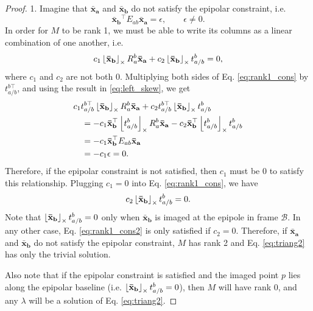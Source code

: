 	\begin{proof}
		1. Imagine that $\mathbf{\bar{x}_a}$ and $\mathbf{\bar{x}_b}$ do not satisfy the epipolar constraint, i.e.
		\begin{equation}
		\mathbf{\bar{x}_b}^\top E_{ab} \mathbf{\bar{x}_a} = \epsilon, \qquad \epsilon \neq 0.
		\end{equation}
		In order for $M$ to be rank 1, we must be able to write its columns as a linear combination of one another, i.e.
		\begin{equation}
		c_1 \ss{\mathbf{\bar{x}_b}} R_a^b \mathbf{\bar{x}_a} + c_2 \ss{\mathbf{\bar{x}_b}} t_{a/b}^b = 0,
		\label{eq:rank1_cons}
		\end{equation}
		where $c_1$ and $c_2$ are not both 0. Multiplying both sides of Eq. \ref{eq:rank1_cons} by $t_{a/b}^{b\top}$, and using the result in \ref{eq:left_skew}, we get 
		\begin{align}
		&c_1 t_{a/b}^{b\top} \ss{\mathbf{\bar{x}_b}} R_a^b \mathbf{\bar{x}_a} + c_2 t_{a/b}^{b\top} \ss{\mathbf{\bar{x}_b}} t_{a/b}^b \\
		&\quad = -c_1 \mathbf{\bar{x}_b}^\top \ss{t_{a/b}^b} R_a^b \mathbf{\bar{x}_a} - c_2 \mathbf{\bar{x}_b}^\top \ss{t_{a/b}^b} t_{a/b}^b \\
		&\quad = -c_1 \mathbf{\bar{x}_b}^\top E_{ab} \mathbf{\bar{x}_a} \\
		&\quad = -c_1 \epsilon = 0.
		\end{align}
		Therefore, if the epipolar constraint is not satisfied, then $c_1$ must be 0 to satisfy this relationship. Plugging $c_1 = 0$ into Eq. \ref{eq:rank1_cons}, we have
		\begin{equation}
		c_2 \ss{\mathbf{\bar{x}_b}} t_{a/b}^b = 0.
		\label{eq:rank1_cons2}
		\end{equation}
		Note that $\ss{\mathbf{\bar{x}_b}} t_{a/b}^b = 0$ only when $\mathbf{\bar{x}_b}$ is imaged at the epipole in frame $\mathcal{B}$. In any other case, Eq. \ref{eq:rank1_cons2} is only satisfied if $c_2 = 0$. Therefore, if $\mathbf{\bar{x}_a}$ and $\mathbf{\bar{x}_b}$ do not satisfy the epipolar constraint, $M$ has rank 2 and Eq. \ref{eq:triang2} has only the trivial solution.
		
		Also note that if the epipolar constraint is satisfied and the imaged point $p$ lies along the epipolar baseline (i.e. $\ss{\mathbf{\bar{x}_b}} t_{a/b}^b = 0$), then $M$ will have rank 0, and any $\lambda$ will be a solution of Eq. \ref{eq:triang2}.
	\end{proof}
	
